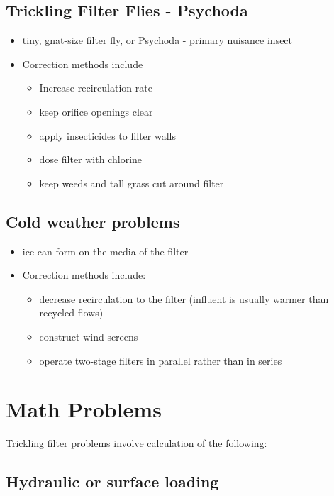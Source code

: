 \subsection{Trickling Filter Flies - Psychoda}

\begin{itemize}
\item tiny, gnat-size filter fly, or Psychoda - primary nuisance insect
\item Correction methods include
\begin{itemize}
\item Increase recirculation rate
\item keep orifice openings clear
\item apply insecticides to filter walls
\item dose filter with chlorine
\item keep weeds and tall grass cut around filter
\end{itemize}
\end{itemize}


\subsection{Cold weather problems}

\begin{itemize}
\item ice can form on the media of the filter
\item Correction methods include:
\begin{itemize}
\item decrease recirculation to the filter (influent is usually warmer than recycled flows)
\item construct wind screens
\item operate two-stage filters in parallel rather than in series
\end{itemize}
\end{itemize}


\section{Math Problems}

Trickling filter problems involve calculation of the following:

\subsection{Hydraulic or surface loading}

